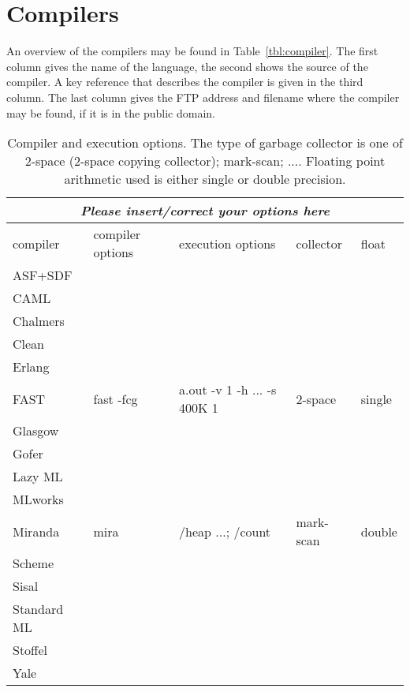 \section{Compilers}
An overview of the compilers may be found in Table~\ref{tbl:compiler}.
The first column gives the name of the language, the second shows the
source of the compiler. A key reference that describes the compiler is
given in the third column. The last column gives the FTP address and
filename where the compiler may be found, if it is in the public
domain.

\begin{table}
\small
\begin{tabular}{|l|l|l|l|l|}
\hline
\multicolumn{5}{|c|}{\em Please insert/correct your options here} \\
\hline
compiler     & compiler options& execution options           & collector& float\\
\hline
ASF+SDF      &                 &                             &          & \\
CAML         &                 &                             &          & \\
Chalmers     &                 &                             &          & \\
Clean        &                 &                             &          & \\
Erlang       &                 &                             &          & \\
FAST         & fast -fcg       & a.out -v 1 -h ... -s 400K 1 & 2-space  & single\\
Glasgow      &                 &                             &          & \\
Gofer        &                 &                             &          & \\
Lazy ML      &                 &                             &          & \\
MLworks      &                 &                             &          & \\
Miranda      & mira            & /heap ...; /count           & mark-scan& double\\
Scheme       &                 &                             &          & \\
Sisal        &                 &                             &          & \\
Standard ML  &                 &                             &          & \\
Stoffel      &                 &                             &          & \\
Yale         &                 &                             &          & \\
\hline
\end{tabular}
\caption{Compiler and execution options. The type of garbage collector
is one of 2-space (2-space copying collector); mark-scan; .... Floating
point arithmetic used is either single or double precision. }
\label{tbl:option}
\normalsize
\end{table}


